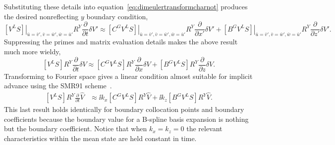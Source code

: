 Substituting these details into equation~\eqref{eq:dimeulertransformcharnot}
produces the desired nonreflecting $y$ boundary condition,
\[
\label{eq:dimeulertransformcharnotYwieldy}
\left.\left[
  V^L S
\right]\right|_{\bar{u}=\bar{v}', \bar{v}=\bar{w}', \bar{w}=\bar{u}'}
  R^Y
  \frac{\partial}{\partial{}t}
  \delta{}V'
\approx
\left.\left[
  C^G V^L S
\right]\right|_{\bar{u}=\bar{v}', \bar{v}=\bar{w}', \bar{w}=\bar{u}'}
  R^Y
  \frac{\partial}{\partial{}x'}
  \delta{}V'
  +
\left.\left[
  B^G V^L S
\right]\right|_{\bar{u}=\bar{v}', \bar{v}=\bar{w}', \bar{w}=\bar{u}'}
  R^Y
  \frac{\partial}{\partial{}z'}
  \delta{}V'
.
\]
Suppressing the primes and matrix evaluation details makes the above result
much more wieldy,
\[
\label{eq:dimeulertransformcharnotYphys}
  \left[V^L S\right]
  R^Y
  \frac{\partial}{\partial{}t}
  \delta{}V
\approx
  \left[C^G V^L S\right]
  R^Y
  \frac{\partial}{\partial{}x}
  \delta{}V
  +
  \left[B^G V^L S\right]
  R^Y
  \frac{\partial}{\partial{}z}
  \delta{}V
.
\]
Transforming to Fourier space gives a linear condition almost suitable
for implicit advance using the SMR91
scheme~\cite{spalart_lowstoragerk, Ulerich_SZPerfect}.
\begin{align}
\label{eq:dimeulertransformcharnotYwave}
  \left[V^L S\right]
  R^Y
  \frac{\partial}{\partial{}t}
  \hat{V}
&\approx
  \ii k_x
  \left[C^G V^L S\right]
  R^Y
  \hat{V}
  +
  \ii k_z
  \left[B^G V^L S\right]
  R^Y
  \hat{V}
.
\end{align}
This last result holds identically for boundary collocation points and boundary
coefficients because the boundary value for a B-spline basis expansion is
nothing but the boundary coefficient.  Notice that when $k_x=k_z=0$ the
relevant characteristics within the mean state are held constant in time.

